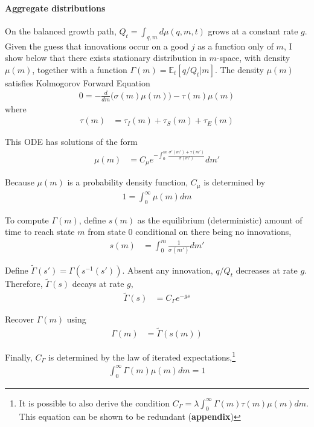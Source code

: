 \documentclass[12pt,english]{article}
\theoremstyle{remark}
\begin{document}
\paragraph{Aggregate distributions} 

On the balanced growth path, $Q_t = \int_{q,m} d\mu(q,m,t)$ grows at a constant rate $g$. Given the guess that innovations occur on a good $j$ as a function only of $m$, I show below that there exists stationary distribution in $m$-space, with density $\mu(m)$, together with a function $\Gamma(m) = \mathbb{E}_t[q/Q_t|m]$. The density $\mu(m)$ satisfies Kolmogorov Forward Equation
\begin{align}
0 = - \frac{d}{dm} \Big( \sigma(m) \mu(m) \Big) - \tau(m) \mu(m)  \label{KF_equation}
\end{align}
where
\begin{align}
\tau(m) &= \tau_I(m) + \tau_S(m) + \tau_E(m) 
\end{align}

This ODE has solutions of the form
\begin{align}
\mu(m) &= C_\mu e^{-\int_0^m \frac{\sigma'(m') + \tau(m')}{\sigma(m')}} dm' \label{KF_solution_1}
\end{align}

Because $\mu(m)$ is a probability density function, $C_\mu$ is determined by
\begin{align}
1 = \int_0^{\infty} \mu(m) dm \label{KF_solution_2}
\end{align}

To compute $\Gamma(m)$, define $s(m)$ as the equilibrium (deterministic) amount of time to reach state $m$ from state $0$ conditional on there being no innovations, 
\begin{align}
s(m) &= \int_0^m \frac{1}{\sigma(m')} dm'
\end{align}

Define $\tilde{\Gamma}(s') = \Gamma(s^{-1}(s'))$. Absent any innovation, $q/Q_t$ decreases at rate $g$. Therefore, $\tilde{\Gamma}(s)$ decays at rate $g$, 
\begin{align}
\tilde{\Gamma}(s) &= C_{\Gamma} e^{-gs}
\end{align}

Recover $\Gamma(m)$ using 
\begin{align}
\Gamma(m) &= \tilde{\Gamma}(s(m))
\end{align}

Finally, $C_{\Gamma}$ is determined by the law of iterated expectations,\footnote{It is possible to also derive the condition $C_{\Gamma} = \lambda \int_0^{\infty} \Gamma(m) \tau(m) \mu(m) dm$. This equation can be shown to be redundant (\textbf{appendix})}
\begin{align}
\int_0^{\infty} \Gamma(m) \mu(m) dm = 1
\end{align}
\end{document}
